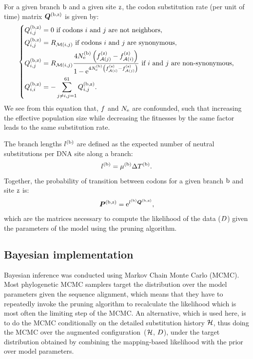 \documentclass{article}
\begin{document}
    For a given branch $\text{b}$ and a given site $\text{z}$, the {codon} {substitution} rate (per unit of time) matrix $\bm{Q}^{(\text{b}, \text{z})}$ is given by:
    \begin{equation}
        \label{eq:subrates}
        \begin{dcases}
            Q^{(\text{b}, \text{z})}_{{i}, {j}} = 0\text{ if codons ${i}$ and ${j}$ are not neighbors,} \\
            Q^{(\text{b}, \text{z})}_{{i}, {j}} = R_{\mathcal{M}({i}, {j})}\text{ if codons ${i}$ and ${j}$ are {synonymous},} \\
            Q^{(\text{b}, \text{z})}_{{i}, {j}} = R_{\mathcal{M}({i}, {j})} \dfrac{4N_{\text{e}}^{(\text{b})} \left({f_{\mathcal{A}({j})}^{(\text{z})} - f_{\mathcal{A}({i})}^{(\text{z})}}\right)}{{1 - \text{e}^{4N_{\text{e}}^{(\text{b})}\left({f_{\mathcal{A}({i})}^{(\text{z})} - f_{\mathcal{A}({j})}^{(\text{z})}}\right)} }} \text{ if ${i}$ and ${j}$ are non-synonymous,}\\
            Q^{(\text{b}, \text{z})}_{{i}, {i}} = - \sum\limits_{ {j} \neq {i}, {j}=1}^{61} Q^{(\text{b}, \text{z})}_{{i}, {j}}.
        \end{dcases}
    \end{equation}
    We see from this equation that, $f$ and $N_{\text{e}}$ are confounded, such that increasing the {effective population size} while decreasing the fitnesses by the same factor leads to the same {substitution} rate.

    The branch lengths $l^{(\text{b})}$ are defined as the expected number of {neutral} substitutions per {DNA} site along a branch:
    \begin{equation}
        \label{eq:branchlength}
        l^{(\text{b})} = \mu^{(\text{b})} \Delta T^{(\text{b})}.
    \end{equation}
    Together, the probability of transition between codons for a given branch $\text{b}$ and site $\text{z}$ is:
    \begin{equation}
        \label{eq:Probmatrix}
        \bm{P}^{(\text{b}, \text{z})} = \text{e}^{l^{(\text{b})} \bm{Q}^{(\text{b}, \text{z})}},
    \end{equation}
    which are the matrices necessary to compute the {likelihood} of the data ($D$) given the parameters of the model using the pruning algorithm.

    \subsection{Bayesian implementation}
    \label{sec:Bayesian}
    Bayesian inference was conducted using Markov Chain Monte Carlo (MCMC).
    Most phylogenetic {MCMC} samplers target the distribution over the model parameters given the sequence alignment, which means that they have to repeatedly invoke the pruning algorithm to recalculate the {likelihood} which is most often the limiting step of the {MCMC}.
    An alternative, which is used here, is to do the {MCMC} conditionally on the detailed {substitution} history $\mathcal{H}$, thus doing the {MCMC} over the augmented configuration~($\mathcal{H}$, $D$), under the target distribution obtained by combining the mapping-based {likelihood} with the {prior} over model parameters.
\end{document}
